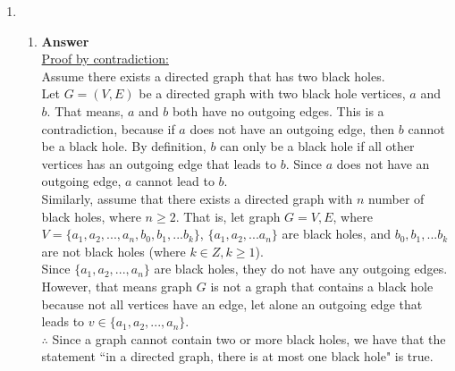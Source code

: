 \documentclass[12pt]{book}
\begin{document}
\newcommand{\reporttitle}{Assignment 2}
\newcommand{\reportauthorOne}{Kien Do}
\newcommand{\cidOne}{300163370}






\begin{enumerate}
    \item 
    \begin{enumerate}
        \item \textbf{Answer}\\
        
        \underline{Proof by contradiction:}\\
        
        Assume there exists a directed graph that has two black holes.\\
        
        Let $G = (V, E)$ be a directed graph with two black hole vertices, $a$ and $b$. That means, $a$ and $b$ both have no outgoing edges. This is a contradiction, because if $a$ does not have an outgoing edge, then $b$ cannot be a black hole. By definition, $b$ can only be a black hole if all other vertices has an outgoing edge that leads to $b$. Since $a$ does not have an outgoing edge, $a$ cannot lead to $b$.\\
        
        Similarly, assume that there exists a directed graph with $n$ number of black holes, where $n \geq 2$. That is, let graph $G = {V, E}$, where $V = \{a_1, a_2,... , a_n, b_0, b_1,...b_k\}$, $\{a_1, a_2,... a_n\}$ are black holes, and ${b_0, b_1,... b_k}$ are not black holes (where $k \in Z, k \geq 1$).\\
        
        Since $\{a_1, a_2,... , a_n\}$ are black holes, they do not have any outgoing edges. However, that means graph $G$ is not a graph that contains a black hole because not all vertices have an edge, let alone an outgoing edge that leads to $v \in \{a_1, a_2,... , a_n\}$.\\
        
        $\therefore$ Since a graph cannot contain two or more black holes, we have that the statement ``in a directed graph, there is at most one black hole" is true.\\
        

\end{enumerate}
\end{enumerate}
\end{document}
